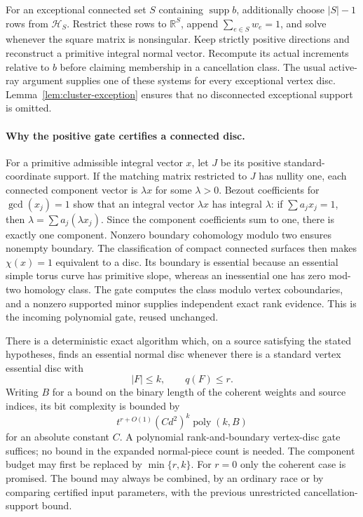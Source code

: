 For an exceptional connected set $S$ containing
$\operatorname{supp}b$, additionally choose $|S|-1$ rows from
$\mathcal H_S$.  Restrict these rows to $\mathbb R^S$, append
$\sum_{e\in S}w_e=1$, and solve whenever the square matrix is
nonsingular.  Keep strictly positive directions and reconstruct a
primitive integral normal vector.  Recompute its actual increments
relative to $b$ before claiming membership in a cancellation class.  The
usual active-ray argument supplies one of these systems for every
exceptional vertex disc.  Lemma~\ref{lem:cluster-exception} ensures that
no disconnected exceptional support is omitted.

\paragraph{Why the positive gate certifies a connected disc.}
For a primitive admissible integral vector $x$, let $J$ be its positive
standard-coordinate support.  If the matching matrix restricted to $J$
has nullity one, each connected component vector is $\lambda x$ for
some $\lambda>0$.  Bezout coefficients for $\gcd(x_j)=1$ show that an
integral vector $\lambda x$ has integral $\lambda$: if
$\sum a_jx_j=1$, then $\lambda=\sum a_j(\lambda x_j)$.  Since the
component coefficients sum to one, there is exactly one component.
Nonzero boundary cohomology modulo two ensures nonempty boundary.  The
classification of compact connected surfaces then makes $\chi(x)=1$
equivalent to a disc.  Its boundary is essential because an essential
simple torus curve has primitive slope, whereas an inessential one has
zero mod-two homology class.  The gate computes the class modulo vertex
coboundaries, and a nonzero supported minor supplies independent exact
rank evidence.  This is the incoming polynomial gate, reused unchanged.

\begin{theorem}\label{thm:cluster-complexity}
There is a deterministic exact algorithm which, on a source satisfying
the stated hypotheses, finds an essential normal disc whenever there is
a standard vertex essential disc with
\[
                         |F|\le k,\qquad q(F)\le r.
\]
Writing $B$ for a bound on the binary length of the coherent weights and
source indices, its bit complexity is bounded by
\begin{equation}\label{eq:cluster-cost}
          t^{r+O(1)}(C d^2)^k\operatorname{poly}(k,B)
\end{equation}
for an absolute constant $C$.  A polynomial rank-and-boundary vertex-disc
gate suffices; no bound in the expanded normal-piece count is needed.
The component budget may first be replaced by $\min\{r,k\}$.
For $r=0$ only the coherent case is promised.  The bound may always be
combined, by an ordinary race or by comparing certified input
parameters, with the previous unrestricted cancellation-support bound.
\end{theorem}

